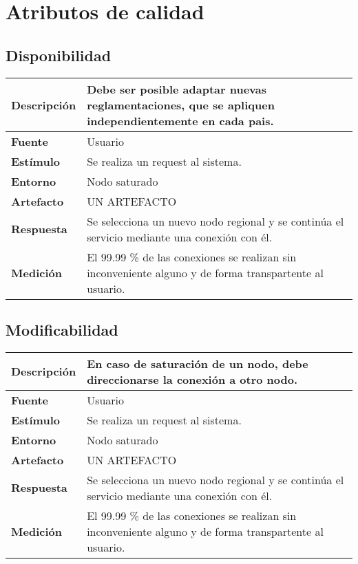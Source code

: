 \section{Atributos de calidad}
\subsection{Disponibilidad}

\begin{center}
  \begin{tabular}{| l | p{10cm} | }
    \hline
  \textbf{Descripción} & Debe ser posible adaptar nuevas reglamentaciones, que se apliquen independientemente en cada pais.\\  \hline
  \textbf{Fuente} & Usuario\\  \hline
  \textbf{Estímulo} & Se realiza un request al sistema.\\  \hline
  \textbf{Entorno} & Nodo saturado\\  \hline
  \textbf{Artefacto} & UN ARTEFACTO\\  \hline
  \textbf{Respuesta} & Se selecciona un nuevo nodo regional y se continúa el servicio mediante una conexión con él.\\  \hline
  \textbf{Medición} & El 99.99 \% de las conexiones se realizan sin inconveniente alguno y de forma transpartente al usuario.\\  \hline
  \end{tabular}
\end{center} 

\subsection{Modificabilidad}

\begin{center}
  \begin{tabular}{| l | p{10cm} | }
    \hline
  \textbf{Descripción} & En caso de saturación de un nodo, debe direccionarse la conexión a otro nodo.\\  \hline
  \textbf{Fuente} & Usuario\\  \hline
  \textbf{Estímulo} & Se realiza un request al sistema.\\  \hline
  \textbf{Entorno} & Nodo saturado\\  \hline
  \textbf{Artefacto} & UN ARTEFACTO\\  \hline
  \textbf{Respuesta} & Se selecciona un nuevo nodo regional y se continúa el servicio mediante una conexión con él.\\  \hline
  \textbf{Medición} & El 99.99 \% de las conexiones se realizan sin inconveniente alguno y de forma transpartente al usuario.\\  \hline
  \end{tabular}
\end{center} 

